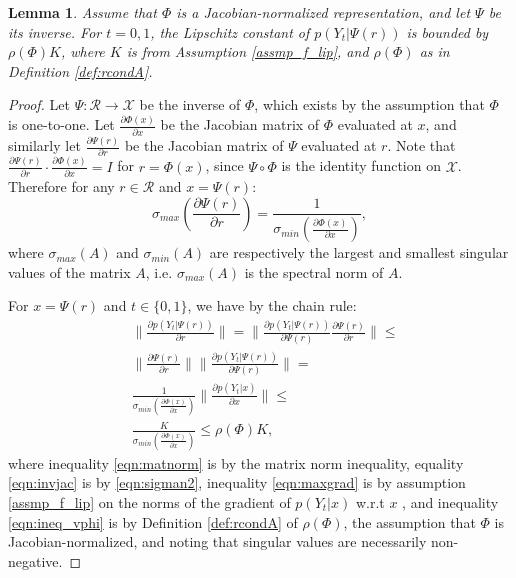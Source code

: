 \documentclass{article}
\newtheorem{thmapplem}{Lemma}
\def\cX{\mathcal X}
\def\cR{\mathcal{R}}
\newcommand{\dPhi}{\frac{\partial \Phi(x)}{\partial x}}
\newcommand{\dPsi}{\frac{\partial \Psi(r)}{\partial r}}
\begin{document}
\begin{thmapplem}\label{lem:lip}
Assume that $\Phi$ is a Jacobian-normalized representation, and let $\Psi$ be its inverse.
For $t=0,1$, the Lipschitz constant of $p(Y_t|\Psi(r))$ is bounded by $\rho(\Phi) K$, where  $K$ is from Assumption \ref{assmp_f_lip}, and $\rho(\Phi)$ as in Definition \ref{def:rcondA}.
\end{thmapplem}
\begin{proof}
Let $\Psi: \cR \rightarrow \cX$ be the inverse of $\Phi$, which exists by the assumption that $\Phi$ is one-to-one. Let $\dPhi$ be the Jacobian matrix of $\Phi$ evaluated at $x$, and similarly let $\dPsi$ be the Jacobian matrix of $\Psi$ evaluated at $r$. Note that $\dPsi \cdot \dPhi = I$ for $r= \Phi(x)$, since $\Psi \circ \Phi$ is the identity function on $\cX$.	Therefore for any $r \in \cR$ and $x= \Psi(r)$:
\begin{equation}\label{eqn:sigman2}
\sigma_{max}\left(\dPsi\right) = \frac{1}{\sigma_{min}\left(\dPhi\right)},
\end{equation}
where $\sigma_{max}(A)$ and $\sigma_{min}(A)$ are respectively the largest and smallest singular values of the matrix $A$, i.e. $\sigma_{max}(A)$ is the spectral norm of $A$.


For $x = \Psi(r)$ and $t \in \{0,1\}$, we have by the chain rule:
\begin{align}
& \| \frac{\partial p(Y_t|\Psi(r))}{\partial r} \| =  \| \frac{\partial p(Y_t|\Psi(r))}{\partial \Psi(r)}  \dPsi\|  \leq \label{eqn:matnorm}\\
& \| \dPsi\|  \| \frac{\partial p(Y_t|\Psi(r))}{\partial \Psi(r)} \|  = \label{eqn:invjac} \\
& \frac{1}{\sigma_{min}\left(\dPhi\right)} \| \frac{\partial p(Y_t|x)}{\partial x} \| \leq \label{eqn:maxgrad}\\
&  \frac{K}{\sigma_{min}\left(\dPhi\right)} \leq  \rho(\Phi) K \label{eqn:ineq_vphi},
\end{align}
where inequality \eqref{eqn:matnorm} is by the matrix norm inequality, equality \eqref{eqn:invjac} is by \eqref{eqn:sigman2}, inequality \eqref{eqn:maxgrad} is by assumption \ref{assmp_f_lip} on the norms of the gradient of $p(Y_t|x)$ w.r.t $x$ , and inequality \eqref{eqn:ineq_vphi} is by Definition \ref{def:rcondA} of $\rho(\Phi)$, the assumption that $\Phi$ is Jacobian-normalized, and noting that singular values are necessarily non-negative.



\end{proof}
\end{document}
